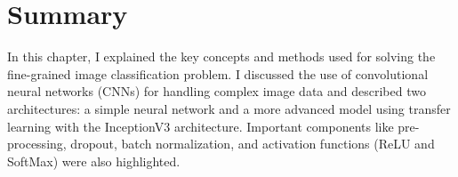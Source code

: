 \section{Summary}
In this chapter, I explained the key concepts and methods used for solving the fine-grained image classification problem. I discussed the use of convolutional neural networks (CNNs) for handling complex image data and described two architectures: a simple neural network and a more advanced model using transfer learning with the InceptionV3 architecture. Important components like pre-processing, dropout, batch normalization, and activation functions (ReLU and SoftMax) were also highlighted.


